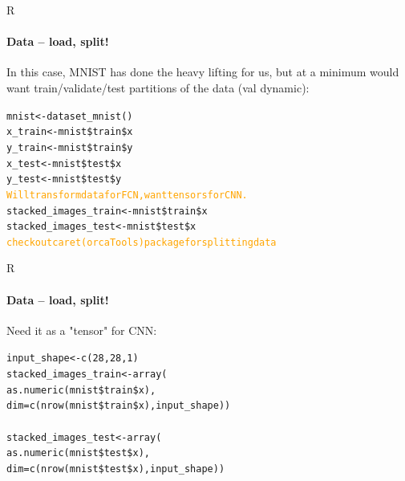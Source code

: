 \documentclass{beamer}
\begin{document}
\begin{darkframes}
    \begin{frame}{R}
      \framesubtitle{Data -- load, split!}{\vspace*{-.5cm}}
    \begin{block}{\small{In this case, MNIST has done the heavy lifting for us, but at a minimum would want train/validate/test partitions of the data (val dynamic):}}{\vspace*{-.3cm}}
        \small{\begin{alltt}
            mnist <- dataset\_mnist() \\
            x\_train <- mnist\$train\$x \\
            y\_train <- mnist\$train\$y \\
            x\_test <- mnist\$test\$x \\
            y\_test <- mnist\$test\$y \\
            \textcolor{orange}{Will transform data for FCN, want tensors for CNN.} \\
            stacked\_images\_train <- mnist\$train\$x \\
            stacked\_images\_test <- mnist\$test\$x \\
            \textcolor{orange}{check out caret (or caTools) package for splitting data}
        \end{alltt}}
    \end{block}
    \end{frame}
    
    \begin{frame}{R}
      \framesubtitle{Data -- load, split!}
    \begin{block}{\small{Need it as a "tensor" for CNN:}}
        \small{\begin{alltt}
            input\_shape <- c(28, 28, 1) \\
            stacked\_images\_train <- array( \\
                 as.numeric(mnist\$train\$x), \\
                 dim = c(nrow(mnist\$train\$x), input\_shape)) \\
            \\
            stacked\_images\_test <- array( \\
                 as.numeric(mnist\$test\$x),  \\
                 dim = c(nrow(mnist\$test\$x), input\_shape)) 
        \end{alltt}}
    \end{block}
    \end{frame}
    

\end{darkframes}
\end{document}
